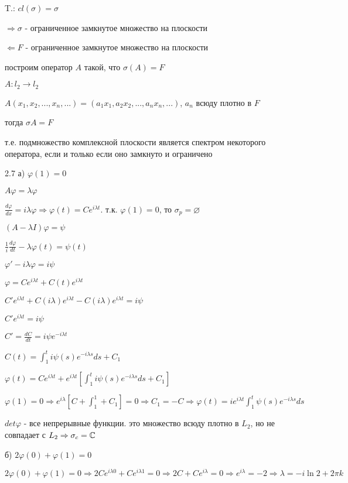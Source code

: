 \documentclass[russian]{article}
\begin{document}
T.: $cl(\sigma) = \sigma$

$\Rightarrow \sigma $ - ограниченное замкнутое множество на плоскости

$\Leftarrow F $ - ограниченное замкнутое множество на плоскости

построим оператор $A$ такой, что $\sigma(A) = F$

$A:l_2 \to l_2$

$A(x_1, x_2, ..., x_n, ...) = (a_1 x_1, a_2 x_2, ..., a_n x_n, ...)$, $a_n$ всюду плотно в $F$

тогда $\sigma A = F$

т.е. подмножество комплексной плоскости является спектром некоторого оператора, если и только если оно замкнуто и ограничено

2.7 а) $\varphi (1) = 0$

$A \varphi = \lambda \varphi$

$\frac{d\varphi}{dx} = i\lambda \varphi \Rightarrow \varphi(t) = C e^{i\lambda t}$. т.к. $\varphi (1) = 0$, то $\sigma_p = \varnothing$

$(A- \lambda I)\varphi = \psi$

$\frac{1}{i}\frac{d\varphi}{dt} - \lambda \varphi(t) = \psi(t)$

$\varphi'-i \lambda \varphi = i \psi$

$\varphi = C e^{i \lambda t} + C(t)e^{i \lambda t}$

$C'e^{i\lambda t} + C(i \lambda) e ^ {i \lambda t} - C(i \lambda) e ^ {i \lambda t} = i \psi$

$C'e^{i\lambda t} = i \psi$

$C' = \frac{dC}{dt}=i\psi e^{-i \lambda t}$

$C(t) = \int _1^t i\psi(s)e^{-i\lambda s}ds + C_1$

$\varphi(t) = Ce^{i \lambda t} + e ^ {i \lambda t} [ \int _1^t i\psi(s) e ^{-i \lambda s}ds + C_1]$

$\varphi(1) = 0 \Rightarrow e^{i \lambda} [C + \int_1^1 + C_1] = 0 \Rightarrow C_1 = -C \Rightarrow \varphi(t) = ie^{i\lambda t} \int_1^t\psi(s)e^{-i 
\lambda s} ds$

$det \varphi$ - все непрерывные функции. это множество всюду плотно в $L_2$, но не совпадает с $L_2 \Rightarrow \sigma_c = \Bbb C$

б) $2\varphi(0)+\varphi(1) = 0$

$2\varphi(0)+\varphi(1) = 0 \Rightarrow 2 C e^{i \lambda 0} + C e^{i \lambda 1} = 0 \Rightarrow 2 C + C e^{i \lambda} = 0 \Rightarrow e^{i \lambda} = -2 \Rightarrow \lambda = -i \ln 2 + 2\pi k$
\end{document}
